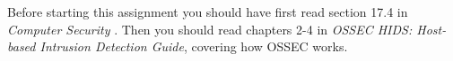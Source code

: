 Before starting this assignment you should have first read section 17.4 in 
\emph{Computer Security} \cite{Gollmann2011cs}.
Then you should read chapters 2-4 \cite{ossec2,ossec3,ossec4} in \emph{OSSEC 
HIDS: Host-based Intrusion Detection Guide}, covering how OSSEC works.
